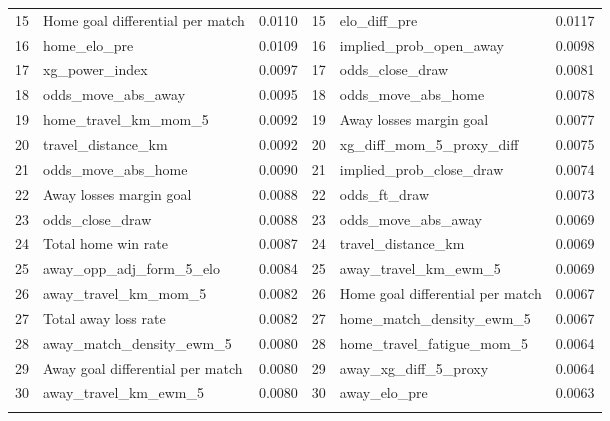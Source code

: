 \documentclass[pdflatex,sn-mathphys-num]{sn-jnl}
\theoremstyle{thmstyleone}
\theoremstyle{thmstyletwo}
\theoremstyle{thmstylethree}
\begin{document}
\begin{table}[h]
\begin{tabular*}{\textwidth}{@{\extracolsep\fill}rlc|rlc@{}}
15 & Home goal differential per match   & 0.0110 & 15 & elo\_diff\_pre                          & 0.0117 \\
16 & home\_elo\_pre                     & 0.0109 & 16 & implied\_prob\_open\_away               & 0.0098 \\
17 & xg\_power\_index                   & 0.0097 & 17 & odds\_close\_draw                       & 0.0081 \\
18 & odds\_move\_abs\_away               & 0.0095 & 18 & odds\_move\_abs\_home                   & 0.0078 \\
19 & home\_travel\_km\_mom\_5            & 0.0092 & 19 & Away losses margin goal                 & 0.0077 \\
20 & travel\_distance\_km                & 0.0092 & 20 & xg\_diff\_mom\_5\_proxy\_diff           & 0.0075 \\
21 & odds\_move\_abs\_home               & 0.0090 & 21 & implied\_prob\_close\_draw              & 0.0074 \\
22 & Away losses margin goal            & 0.0088 & 22 & odds\_ft\_draw                          & 0.0073 \\
23 & odds\_close\_draw                  & 0.0088 & 23 & odds\_move\_abs\_away                   & 0.0069 \\
24 & Total home win rate                & 0.0087 & 24 & travel\_distance\_km                    & 0.0069 \\
25 & away\_opp\_adj\_form\_5\_elo        & 0.0084 & 25 & away\_travel\_km\_ewm\_5                & 0.0069 \\
26 & away\_travel\_km\_mom\_5            & 0.0082 & 26 & Home goal differential per match        & 0.0067 \\
27 & Total away loss rate               & 0.0082 & 27 & home\_match\_density\_ewm\_5            & 0.0067 \\
28 & away\_match\_density\_ewm\_5        & 0.0080 & 28 & home\_travel\_fatigue\_mom\_5           & 0.0064 \\
29 & Away goal differential per match   & 0.0080 & 29 & away\_xg\_diff\_5\_proxy                & 0.0064 \\
30 & away\_travel\_km\_ewm\_5            & 0.0080 & 30 & away\_elo\_pre                          & 0.0063 \\
\botrule
\end{tabular*}
\end{table}
\end{document}
